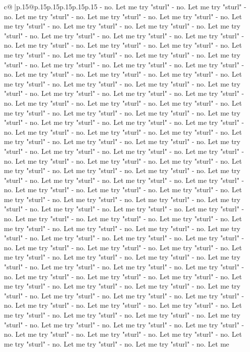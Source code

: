 \documentclass{article}
\begin{document}
{\begin{supertabular}{c@{$\;$}|p{.15\linewidth}@{}p{.15\linewidth}p{.15\linewidth}p{.15\linewidth}p{.15\linewidth}p{.15\linewidth}}
{{{{-} no. Let me try "sturl" {-} no. Let me try "sturl" {-} no. Let me try "sturl" {-} no. Let me try "sturl" {-} no. Let me try "sturl" {-} no. Let me try "sturl" {-} no. Let me try "sturl" {-} no. Let me try "sturl" {-} no. Let me try "sturl" {-} no. Let me try "sturl" {-} no. Let me try "sturl" {-} no. Let me try "sturl" {-} no. Let me try "sturl" {-} no. Let me try "sturl" {-} no. Let me try "sturl" {-} no. Let me try "sturl" {-} no. Let me try "sturl" {-} no. Let me try "sturl" {-} no. Let me try "sturl" {-} no. Let me try "sturl" {-} no. Let me try "sturl" {-} no. Let me try "sturl" {-} no. Let me try "sturl" {-} no. Let me try "sturl" {-} no. Let me try "sturl" {-} no. Let me try "sturl" {-} no. Let me try "sturl" {-} no. Let me try "sturl" {-} no. Let me try "sturl" {-} no. Let me try "sturl" {-} no. Let me try "sturl" {-} no. Let me try "sturl" {-} no. Let me try "sturl" {-} no. Let me try "sturl" {-} no. Let me try "sturl" {-} no. Let me try "sturl" {-} no. Let me try "sturl" {-} no. Let me try "sturl" {-} no. Let me try "sturl" {-} no. Let me try "sturl" {-} no. Let me try "sturl" {-} no. Let me try "sturl" {-} no. Let me try "sturl" {-} no. Let me try "sturl" {-} no. Let me try "sturl" {-} no. Let me try "sturl" {-} no. Let me try "sturl" {-} no. Let me try "sturl" {-} no. Let me try "sturl" {-} no. Let me try "sturl" {-} no. Let me try "sturl" {-} no. Let me try "sturl" {-} no. Let me try "sturl" {-} no. Let me try "sturl" {-} no. Let me try "sturl" {-} no. Let me try "sturl" {-} no. Let me try "sturl" {-} no. Let me try "sturl" {-} no. Let me try "sturl" {-} no. Let me try "sturl" {-} no. Let me try "sturl" {-} no. Let me try "sturl" {-} no. Let me try "sturl" {-} no. Let me try "sturl" {-} no. Let me try "sturl" {-} no. Let me try "sturl" {-} no. Let me try "sturl" {-} no. Let me try "sturl" {-} no. Let me try "sturl" {-} no. Let me try "sturl" {-} no. Let me try "sturl" {-} no. Let me try "sturl" {-} no. Let me try "sturl" {-} no. Let me try "sturl" {-} no. Let me try "sturl" {-} no. Let me try "sturl" {-} no. Let me try "sturl" {-} no. Let me try "sturl" {-} no. Let me try "sturl" {-} no. Let me try "sturl" {-} no. Let me try "sturl" {-} no. Let me try "sturl" {-} no. Let me try "sturl" {-} no. Let me try "sturl" {-} no. Let me try "sturl" {-} no. Let me try "sturl" {-} no. Let me try "sturl" {-} no. Let me try "sturl" {-} no. Let me try "sturl" {-} no. Let me try "sturl" {-} no. Let me try "sturl" {-} no. Let me try "sturl" {-} no. Let me try "sturl" {-} no. Let me try "sturl" {-} no. Let me try "sturl" {-} no. Let me try "sturl" {-} no. Let me try "sturl" {-} no. Let me try "sturl" {-} no. Let me try "sturl" {-} no. Let me try "sturl" {-} no. Let me try "sturl" {-} no. Let me try "sturl" {-} no. Let me try "sturl" {-} no. Let me try "sturl" {-} no. Let me try "sturl" {-} no. Let me try "sturl" {-} no. Let me try "sturl" {-} no. Let me try "sturl" {-} no. Let me try "sturl" {-} no. Let me try "sturl" {-} no. Let me try "sturl" {-} no. Let me try "sturl" {-} no. Let me try "sturl" {-} no. Let me try "sturl" {-} no. Let me try "sturl" {-} no. Let me try "sturl" {-} no. Let me try "sturl" {-} no. Let me try "sturl" {-} no. Let me }}}
\end{supertabular}}
\end{document}
